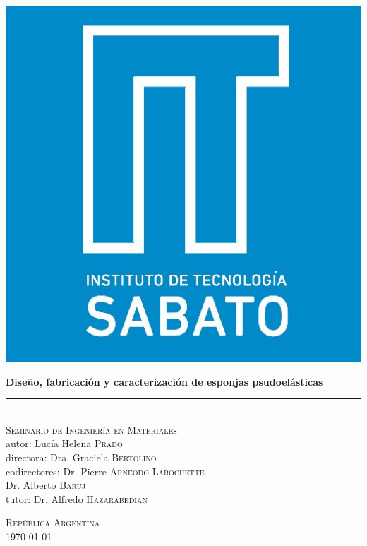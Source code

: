 \begin{titlepage}

\end{titlepage}

\thispagestyle{empty}
\cleardoublepage

\begin{titlepage}
\begin{flushright}
\large \sffamily

\vspace*{-1.7cm}
\includegraphics[width=.2\textwidth]{Img/logo_is.jpg}\\[2cm]

\begin{huge}
\bfseries
\textbf{Diseño, fabricación y caracterización de esponjas psudoelásticas}\par
\end{huge}
\rule{\linewidth}{1.5mm}\\[0.1cm]
\textsc{Seminario de Ingeniería en Materiales}\\[2.5cm]

{\small autor:}
Lucía Helena \textsc{Prado}\\

\vspace{10mm}
{\small directora:}
Dra. Graciela \textsc{Bertolino} \\
{\small codirectores:}
Dr. Pierre \textsc{Arneodo Larochette} \\
Dr. Alberto \textsc{Baruj} \\
{\small tutor:}
Dr. Alfredo \textsc{Hazarabedian} \\


\begin{table}[b]
\flushbottom
\centering \sffamily %
\textsc{República Argentina}\\[1mm]
\today
\end{table}

\end{flushright}
\end{titlepage}

\thispagestyle{empty}
\cleardoublepage